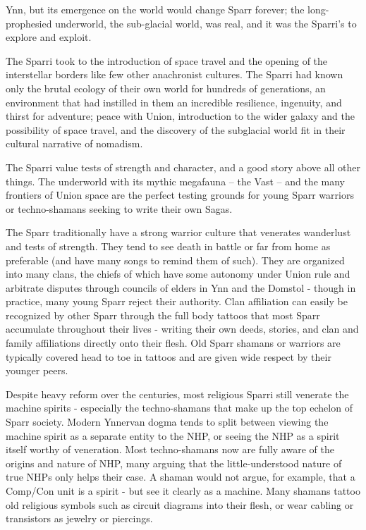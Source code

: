 Ynn, but its emergence on the world would change Sparr forever; the long-prophesied  
underworld, the sub-glacial world, was real, and it was the Sparri’s to explore and exploit.    

The Sparri took to the introduction of space travel and the opening of the interstellar borders like  
few other anachronist cultures. The Sparri had known only the brutal ecology of their own world  
for hundreds of generations, an environment that had instilled in them an incredible resilience,  
ingenuity, and thirst for adventure; peace with Union, introduction to the wider galaxy and the  
possibility of space travel, and the discovery of the subglacial world fit in their cultural narrative of  
nomadism.   

The Sparri value tests of strength and character, and a good story above all other things. The  
underworld with its mythic megafauna -- the Vast -- and the many frontiers of Union space are the  
perfect testing grounds for young Sparr warriors or techno-shamans seeking to write their own  
Sagas.  

The Sparr traditionally have a strong warrior culture that venerates wanderlust and tests of  
strength. They tend to see death in battle or far from home as preferable (and have many songs  
to remind them of such). They are organized into many clans, the chiefs of which have some  
autonomy under Union rule and arbitrate disputes through councils of elders in Ynn and the  
Domstol - though in practice, many young Sparr reject their authority. Clan affiliation can easily be  
recognized by other Sparr through the full body tattoos that most Sparr accumulate throughout  
their lives - writing their own deeds, stories, and clan and family affiliations directly onto their flesh.  
Old Sparr shamans or warriors are typically covered head to toe in tattoos and are given wide  
respect by their younger peers.  

Despite heavy reform over the centuries, most religious Sparri still venerate the machine spirits -  
especially the techno-shamans that make up the top echelon of Sparr society. Modern Ynnervan  
dogma tends to split between viewing the machine spirit as a separate entity to the NHP, or  
seeing the NHP as a spirit itself worthy of veneration. Most techno-shamans now are fully aware  
of the origins and nature of NHP, many arguing that the little-understood nature of true NHPs only  
helps their case. A shaman would not argue, for example, that a Comp/Con unit is a spirit - but  
see it clearly as a machine. Many shamans tattoo old religious symbols such as circuit diagrams  
into their flesh, or wear cabling or transistors as jewelry or piercings.  

